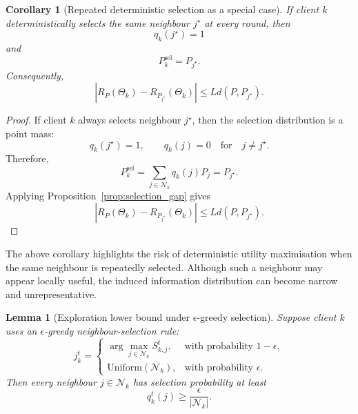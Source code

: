 \documentclass[conference]{IEEEtran}
\newtheorem{lemma}{Lemma}
\newtheorem{corollary}{Corollary}
\begin{document}
\begin{corollary}[Repeated deterministic selection as a special case]
\label{cor:deterministic_selection}
If client $k$ deterministically selects the same neighbour $j^\star$ at every round, then
\begin{equation}
q_k(j^\star)=1
    \label{eq:auto-056}
\end{equation}
and
\begin{equation}
P_k^{\mathrm{sel}}=P_{j^\star}.
    \label{eq:auto-057}
\end{equation}
Consequently,
\begin{equation}
\left|
R_P(\Theta_k)
-
R_{P_{j^\star}}(\Theta_k)
\right|
\leq
L d(P,P_{j^\star}).
    \label{eq:auto-058}
\end{equation}
\end{corollary}

\begin{proof}
If client $k$ always selects neighbour $j^\star$, then the selection distribution is a point mass:
\begin{equation}
q_k(j^\star)=1,
\qquad
q_k(j)=0
\quad
\text{for}
\quad
j\neq j^\star.
    \label{eq:auto-059}
\end{equation}
Therefore,
\begin{equation}
P_k^{\mathrm{sel}}
=
\sum_{j\in\mathcal{N}_k}q_k(j)P_j
=
P_{j^\star}.
    \label{eq:auto-060}
\end{equation}
Applying Proposition~\ref{prop:selection_gap} gives
\begin{equation}
\left|
R_P(\Theta_k)
-
R_{P_{j^\star}}(\Theta_k)
\right|
\leq
L d(P,P_{j^\star}).
    \label{eq:auto-061}
\end{equation}
\end{proof}

The above corollary highlights the risk of deterministic utility maximisation when the same neighbour is repeatedly selected. Although such a neighbour may appear locally useful, the induced information distribution can become narrow and unrepresentative.

\begin{lemma}[Exploration lower bound under $\epsilon$-greedy selection]
\label{lem:epsilon_greedy}
Suppose client $k$ uses an $\epsilon$-greedy neighbour-selection rule:
\begin{equation}
j_k^t =
\begin{cases}
\arg\max_{j\in\mathcal{N}_k}S_{k,j}^t, & \text{with probability } 1-\epsilon,\\
\text{Uniform}(\mathcal{N}_k), & \text{with probability } \epsilon.
\end{cases}
    \label{eq:auto-062}
\end{equation}
Then every neighbour $j\in\mathcal{N}_k$ has selection probability at least
\begin{equation}
q_k^t(j)
\geq
\frac{\epsilon}{|\mathcal{N}_k|}.
    \label{eq:auto-063}
\end{equation}
\end{lemma}
\end{document}

